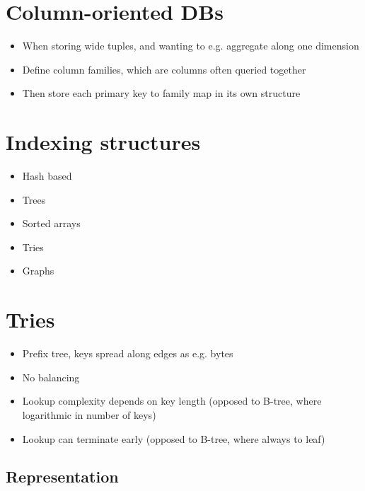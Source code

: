 \documentclass[a4paper]{scrreprt}
\begin{document}
\section{Column-oriented DBs}

\begin{itemize}
		\item When storing wide tuples, and wanting to e.g. aggregate along one dimension
		\item Define column families, which are columns often queried together
		\item Then store each primary key to family map in its own structure
\end{itemize}

\section{Indexing structures}

\begin{itemize}
		\item Hash based
		\item Trees
		\item Sorted arrays
		\item Tries
		\item Graphs
\end{itemize}

\section{Tries}

\begin{itemize}
		\item Prefix tree, keys spread along edges as e.g. bytes
		\item No balancing
		\item Lookup complexity depends on key length (opposed to B-tree, where logarithmic in number of keys)
		\item Lookup can terminate early (opposed to B-tree, where always to leaf)
\end{itemize}

\subsection{Representation}
\end{document}
